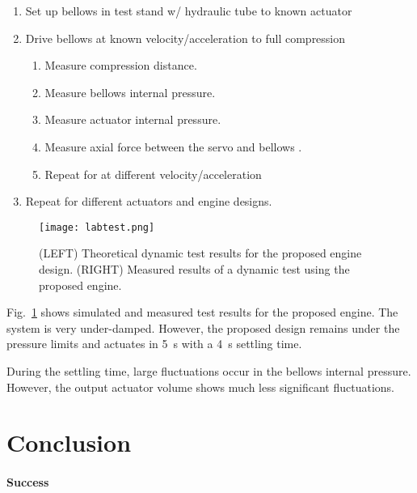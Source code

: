 \begin{enumerate}
\def\labelenumi{\arabic{enumi}.}
\tightlist
\item
  Set up bellows in test stand w/ hydraulic tube to known actuator
\item
  Drive bellows at known velocity/acceleration to full compression

  \begin{enumerate}
  \def\labelenumii{\arabic{enumii}.}
  \tightlist
  \item
    Measure compression distance.
  \item
    Measure bellows internal pressure.
  \item
    Measure actuator internal pressure.
  \item
    Measure axial force between the servo and bellows .
  \item
    Repeat for at different velocity/acceleration
  \end{enumerate}
\item
  Repeat for different actuators and engine designs.
\end{enumerate}

\begin{figure}%
\hypertarget{ch1:fig:dynamics-small}{%
\centering
\texttt{[image: labtest.png]}
\caption{(LEFT) Theoretical dynamic test results for the proposed engine
design. (RIGHT) Measured results of a dynamic test using the proposed engine.}\label{ch1:fig:dynamics-small}
}
\end{figure}


Fig.~\ref{ch1:fig:dynamics-small} shows simulated and measured test results for the proposed engine. The system is very under-damped. However, the proposed
design remains under the pressure limits and actuates in \SI{5}{\second}
with a \SI{4}{\second} settling time.

During the settling time, large fluctuations occur in the bellows
internal pressure. However, the output actuator volume shows much less
significant fluctuations.

\hypertarget{ch1:conclusion}{%
\section{Conclusion}\label{ch1:conclusion}}

\hypertarget{ch1:success}{%
\paragraph{Success}\label{ch1:success}}

